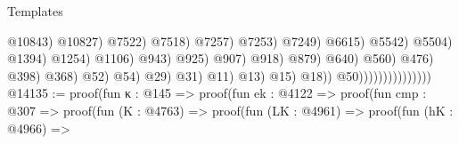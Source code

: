 \begin{lexlean}{Templates}
\begin{coremodule}
                                                                                                    @10843)
                                                                                                  @10827)
                                                                                                @7522)
                                                                                              @7518)
                                                                                            @7257)
                                                                                          @7253)
                                                                                        @7249)
                                                                                      @6615)
                                                                                    @5542)
                                                                                  @5504)
                                                                                @1394)
                                                                              @1254)
                                                                            @1106)
                                                                          @943)
                                                                        @925)
                                                                      @907)
                                                                    @918)
                                                                  @879)
                                                                @640)
                                                              @560)
                                                            @476)
                                                          @398)
                                                        @368)
                                                      @52)
                                                    @54)
                                                  @29)
                                                @31)
                                              @11)
                                            @13)
                                          @15)
                                        @18))
                                  @50)))))))))))))))
@14135 := proof(fun {κ : @145} =>
    proof(fun {ek : @4122} =>
      proof(fun {cmp : @307} =>
        proof(fun (K : @4763) =>
          proof(fun (LK : @4961) =>
            proof(fun (hK : @4966) =>

\end{coremodule}
\end{lexlean}
